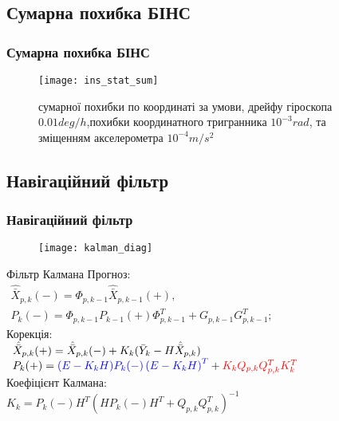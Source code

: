 \documentclass[ucs]{beamer}
\begin{document}
\subsection{Сумарна похибка БІНС} 
\begin{frame}[plain]
\frametitle{Сумарна похибка БІНС}

\begin{figure}[l]
\texttt{[image: ins\_stat\_sum]}

\caption{ сумарної похибки по координаті за умови,
дрейфу гіроскопа   $0.01 deg/h$,похибки координатного тригранника $10^{-3} rad$, та зміщенням акселерометра $10^{-4} m/s^2$}
\label{fig:sdins2}
\end{figure}
\end{frame}
\subsection{Навігаційний фільтр} 
\begin{frame}[plain]
\frametitle{Навігаційний фільтр}
\begin{figure}[l]
\texttt{[image: kalman\_diag]}
\end{figure}
\begin{block}{Фільтр Калмана}
\small
Прогноз: \\
$\begin{array}{l} 
{\hat{\bar{X}}_{p,k}(-) =\Phi_{p,k-1} \hat{\bar{X}}_{p,k-1}(+) ,} \\ 
{P_{k}(-) =\Phi_{p,k-1} P_{k-1}(+) \Phi ^{T}_{p,k-1} +G_{p,k-1} G_{p,k-1}^{T} ;} \end{array} $ \\
Корекція:\\
$\begin{array}{l} 
{\hat{\bar{X}}_{p,k}(+)=\hat{\bar{X}}_{p,k}(-) + K_{k} (\bar{Y}_{k} -H\hat{\bar{X}}_{p,k} )} \\ 
{P_{k}(+)={\color{blue}(E-K_{k} H)P_{k}(-) \left(E-K_{k} H\right)^{T}} +{\color{red} K_{k} Q_{p,k} Q_{p,k} ^{T} K_{k}^{T}} } 
\end{array} $ \\
Коефіцієнт Калмана:\\
$K_{k} =P_{k}(-) H^{T} (HP_{k}(-) H^{T} +Q_{p,k} Q_{p,k} ^{T} )^{-1} $
\end{block}
\end{frame}
\end{document}
